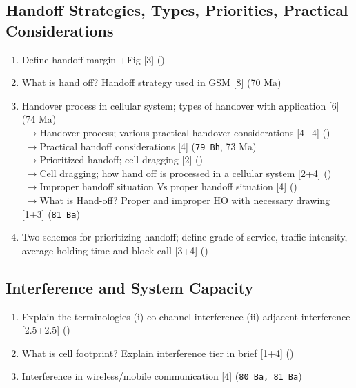 \documentclass[12pt]{article}
\newcommand{\lb}{\\$\left|\rightarrow\right.$}
\begin{document}
  \subsection{Handoff Strategies, Types, Priorities, Practical Considerations}
    \begin{enumerate}[topsep=0pt, noitemsep]
      \item Define handoff margin +Fig \hfill [3] ()
      \item What is hand off? Handoff strategy used in GSM \hfill [8] (70 Ma)
      \item Handover process in cellular system; types of handover with application \hfill [6] (74 Ma)
        \lb Handover process; various practical handover considerations \hfill [4+4] ()
        \lb Practical handoff considerations \hfill [4] (\texttt{79 Bh}, 73 Ma)
        \lb Prioritized handoff; cell dragging \hfill [2] ()
        \lb Cell dragging; how hand off is processed in a cellular system \hfill [2+4] ()
        \lb Improper handoff situation Vs proper handoff situation \hfill [4] ()
        \lb What is Hand-off? Proper and improper HO with necessary drawing \hfill [1+3] (\texttt{81 Ba})
      \item Two schemes for prioritizing handoff; define grade of service, traffic intensity,
        average holding time and block call \hfill [3+4] ()
    \end{enumerate}

  \subsection{Interference and System Capacity}
    \begin{enumerate}[topsep=0pt, noitemsep]
      \item Explain the terminologies (i) co-channel interference (ii) adjacent interference \hfill [2.5+2.5] ()
      \item What is cell footprint? Explain interference tier in brief \hfill [1+4] ()
      \item Interference in wireless/mobile communication \hfill [4] (\texttt{80 Ba, 81 Ba})
    \end{enumerate}
\end{document}
